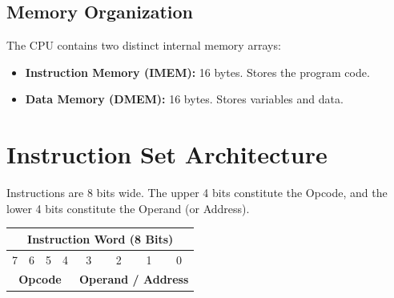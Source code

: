 \documentclass{article}
\begin{document}
\subsection{Memory Organization}
The CPU contains two distinct internal memory arrays:
\begin{itemize}
    \item \textbf{Instruction Memory (IMEM):} 16 bytes. Stores the program code.
    \item \textbf{Data Memory (DMEM):} 16 bytes. Stores variables and data.
\end{itemize}

\section{Instruction Set Architecture}
Instructions are 8 bits wide. The upper 4 bits constitute the Opcode, and the lower 4 bits constitute the Operand (or Address).

\begin{table}[!ht]
\centering
\renewcommand{\arraystretch}{1.5}
\begin{tabular}{|c|c|c|c|c|c|c|c|}
\hline
\multicolumn{8}{|c|}{\textbf{Instruction Word (8 Bits)}} \\
\hline
7 & 6 & 5 & 4 & 3 & 2 & 1 & 0 \\
\hline
\multicolumn{4}{|c|}{\textbf{Opcode}} & \multicolumn{4}{c|}{\textbf{Operand / Address}} \\
\hline
\end{tabular}
\end{table}
\end{document}
